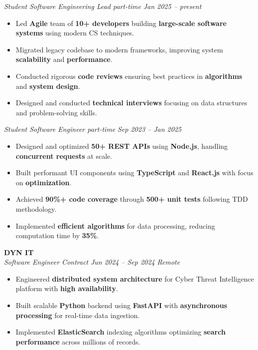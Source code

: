 \documentclass[a4paper, 10pt]{article}
\begin{document}
\noindent\begin{minipage}[t]{0.02\textwidth}
\vspace{-5pt}
\hspace{0pt}{\color[RGB]{229, 229, 229}\rule{1.8pt}{123pt}}
\end{minipage}%
\hspace{0pt}%
\begin{minipage}[t]{0.95\textwidth}
\vspace{-8pt}
\textit{Student Software Engineering Lead \textbar{} part-time} \hfill \textit{Jan 2025 -- present}
\begin{itemize}[leftmargin=10pt, itemsep=-1pt, topsep=2pt]
\item Led \textbf{Agile} team of \textbf{10+ developers} building \textbf{large-scale software systems} using modern CS techniques.
\item Migrated legacy codebase to modern frameworks, improving system \textbf{scalability} and \textbf{performance}.
\item Conducted rigorous \textbf{code reviews} ensuring best practices in \textbf{algorithms} and \textbf{system design}.
\item Designed and conducted \textbf{technical interviews} focusing on data structures and problem-solving skills.
\end{itemize}

\vspace{3pt}
\textit{Student Software Engineer \textbar{} part-time} \hfill \textit{Sep 2023 -- Jan 2025}
\begin{itemize}[leftmargin=10pt, itemsep=-1pt, topsep=2pt]
\item Designed and optimized \textbf{50+ REST APIs} using \textbf{Node.js}, handling \textbf{concurrent requests} at scale.
\item Built performant UI components using \textbf{TypeScript} and \textbf{React.js} with focus on \textbf{optimization}.
\item Achieved \textbf{90\%+ code coverage} through \textbf{500+ unit tests} following TDD methodology.
\item Implemented \textbf{efficient algorithms} for data processing, reducing computation time by \textbf{35\%}.
\end{itemize}
\end{minipage}

\textbf{DYN IT} \\
\textit{Software Engineer \textbar{} Contract} \hfill \textit{Jun 2024 -- Sep 2024 \textbar{} Remote}
\begin{itemize}[leftmargin=10pt, itemsep=-1pt, topsep=2pt]
\item Engineered \textbf{distributed system architecture} for Cyber Threat Intelligence platform with \textbf{high availability}.
\item Built scalable \textbf{Python} backend using \textbf{FastAPI} with \textbf{asynchronous processing} for real-time data ingestion.
\item Implemented \textbf{ElasticSearch} indexing algorithms optimizing \textbf{search performance} across millions of records.
\end{itemize}
\end{document}
